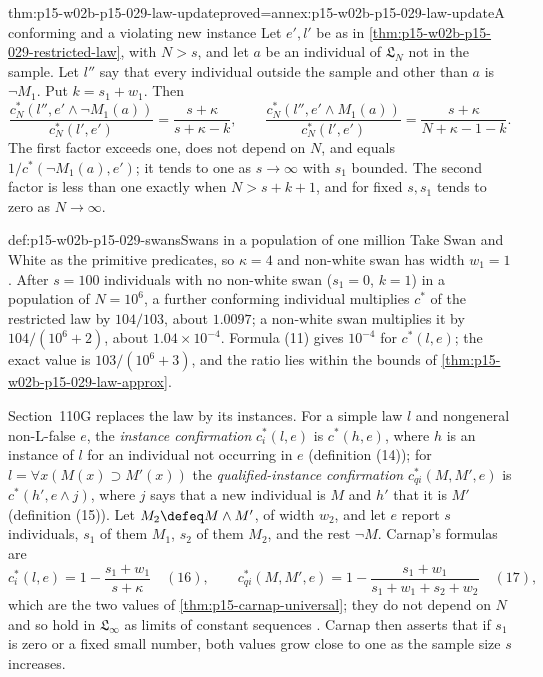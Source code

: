 \begin{hbtheorem}{thm:p15-w02b-p15-029-law-update}{proved=annex:p15-w02b-p15-029-law-update}{A conforming and a violating new instance}
Let \(e',l'\) be as in \cref{thm:p15-w02b-p15-029-restricted-law},
with \(N>s\), and let \(a\) be an individual of \(\mathfrak L_N\) not
in the sample. Let \(l''\) say that every individual outside the
sample and other than \(a\) is \(\neg M_1\). Put \(k=s_1+w_1\). Then
\[
 \frac{c^*_N(l'',e'\land\neg M_1(a))}{c^*_N(l',e')}
 =\frac{s+\kappa}{s+\kappa-k},\qquad
 \frac{c^*_N(l'',e'\land M_1(a))}{c^*_N(l',e')}
 =\frac{s+\kappa}{N+\kappa-1-k}.
\]
The first factor exceeds one, does not depend on \(N\), and equals
\(1/c^*(\neg M_1(a),e')\); it tends to one as \(s\to\infty\) with
\(s_1\) bounded. The second factor is less than one exactly when
\(N>s+k+1\), and for fixed \(s,s_1\) tends to zero as
\(N\to\infty\).
\end{hbtheorem}

\begin{hbexample}{def:p15-w02b-p15-029-swans}{Swans in a population of one million}
Take Swan and White as the primitive predicates, so \(\kappa=4\) and
non-white swan has width \(w_1=1\). After \(s=100\) individuals with
no non-white swan (\(s_1=0\), \(k=1\)) in a population of
\(N=10^6\), a further conforming individual multiplies \(c^*\) of the
restricted law by \(104/103\), about \(1.0097\); a non-white swan
multiplies it by \(104/(10^6+2)\), about \(1.04\times10^{-4}\).
Formula (11) gives \(10^{-4}\) for \(c^*(l,e)\); the exact value is
\(103/(10^6+3)\), and the ratio lies within the bounds of
\cref{thm:p15-w02b-p15-029-law-approx}.
\end{hbexample}

Section~110G replaces the law by its instances. For a simple law
\(l\) and nongeneral non-L-false \(e\), the \emph{instance confirmation}
\(c^*_i(l,e)\) is \(c^*(h,e)\), where \(h\) is an instance of \(l\)
for an individual not occurring in \(e\) (definition (14)); for
\(l=\forall x(M(x)\supset M'(x))\) the \emph{qualified-instance
confirmation} \(c^*_{qi}(M,M',e)\) is \(c^*(h',e\land j)\), where \(j\)
says that a new individual is \(M\) and \(h'\) that it is \(M'\)
(definition (15)). Let \(M_2\defeq M\land M'\), of width \(w_2\), and
let \(e\) report \(s\) individuals, \(s_1\) of them \(M_1\), \(s_2\) of
them \(M_2\), and the rest \(\neg M\). Carnap's formulas are
\[
 c^*_i(l,e)=1-\frac{s_1+w_1}{s+\kappa}\quad(16),\qquad
 c^*_{qi}(M,M',e)=1-\frac{s_1+w_1}{s_1+w_1+s_2+w_2}\quad(17),
\]
which are the two values of \cref{thm:p15-carnap-universal}; they do
not depend on \(N\) and so hold in \(\mathfrak L_\infty\) as limits of
constant sequences \cite[sec.~110G, pp.~572--573]{Carnap1950Probability}.
Carnap then asserts that if \(s_1\) is zero or a fixed small number,
both values grow close to one as the sample size \(s\) increases.

